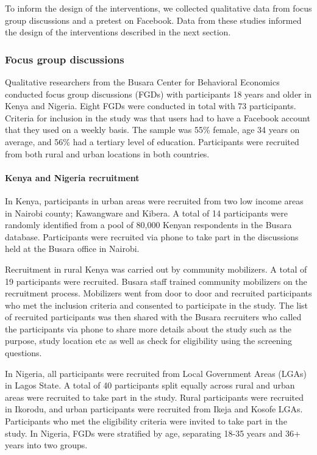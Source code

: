\documentclass[letterpaper, 12pt, parskip=full,DIV=10]{scrartcl}
\begin{document}
To inform the design of the interventions, we collected qualitative data from focus group discussions and a pretest on Facebook. Data from these studies informed the design of the interventions described in the next section.

\subsubsection{Focus group discussions}
Qualitative researchers from the Busara Center for Behavioral Economics conducted focus group discussions (FGDs) with participants 18 years and older in Kenya and Nigeria. Eight FGDs were conducted in total with 73 participants. Criteria for inclusion in the study was that users had to have a Facebook account that they used on a weekly basis. The sample was 55\% female, age 34 years on average, and 56\% had a tertiary level of education. Participants were recruited from both rural and urban locations in both countries. 

\paragraph{Kenya and Nigeria recruitment}
In Kenya, participants in urban areas were recruited from two low income areas in Nairobi county; Kawangware and Kibera. A total of 14 participants were randomly identified from a pool of 80,000 Kenyan respondents in the Busara database. Participants were recruited via phone to take part in the discussions held at the Busara office in Nairobi. 

Recruitment in rural Kenya was carried out by community mobilizers. A total of 19 participants were recruited. Busara staff trained community mobilizers on the recruitment process.  Mobilizers went from door to door and recruited participants who met the inclusion criteria and consented to participate in the study. The list of recruited participants was then shared with the Busara recruiters who called the participants via phone to share more details about the study such as the purpose, study location etc as well as check for eligibility using the screening questions.

In Nigeria, all participants were recruited from Local Government Areas (LGAs) in Lagos State.  A total of 40 participants split equally across rural and urban areas were recruited to take part in the study. Rural participants were recruited in Ikorodu, and urban participants were recruited from Ikeja and Kosofe LGAs. Participants who met the eligibility criteria were invited to take part in the study. In Nigeria, FGDs were stratified by age, separating 18-35 years and 36+ years into two groups. 
\end{document}
